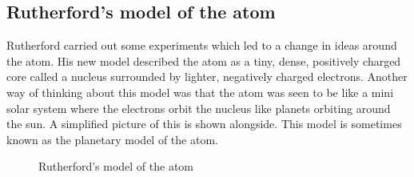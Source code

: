             \subsection*{Rutherford's model of the atom}
            \nopagebreak
\begin{minipage}{.5\textwidth}
            \label{m38756*id254751}Rutherford carried out some experiments which led to a change in ideas around the atom. His new model described the atom as a tiny, dense, positively charged core called a nucleus surrounded by lighter, negatively charged electrons. Another way of thinking about this model was that the atom was seen to be like a mini solar system where the electrons orbit the nucleus like planets orbiting around the sun. A simplified picture of this is shown alongside. This model is sometimes known as the planetary model of the atom.\\
\end{minipage}
\begin{minipage}{.5\textwidth}
	\begin{figure}[H] %
    \begin{center}
\caption{Rutherford's model of the atom}
\end{center}
\label{rutherfordmodel}
 \end{figure} 
\end{minipage}      
      \label{m38756*uid6}
